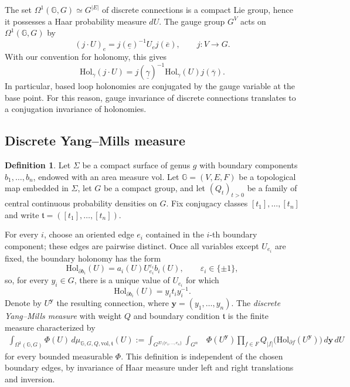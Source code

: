 \documentclass[11pt,a4paper,reqno]{article}
\theoremstyle{definition}
\newtheorem{definition}[theorem]{Definition}
\theoremstyle{remark}
\newcommand\vol{\mathrm{vol}}
\newcommand\Gbb{{\mathbb{G}}}
\newcommand\Hol{{\mathrm{Hol}}}
\begin{document}
The set $\Omega^1(\Gbb,G)\simeq G^{\vert E\vert}$ of discrete connections is a compact Lie group, hence it possesses a Haar probability measure $dU$. The gauge group $G^V$ acts on $\Omega^1(\Gbb,G)$ by
\[
(j\cdot U)_e = j(\underline{e})^{-1}U_e j(\overline{e}),\qquad j:V\to G.
\]
With our convention for holonomy, this gives
\[
\Hol_\gamma(j\cdot U)=j(\underline{\gamma})^{-1}\Hol_\gamma(U)j(\overline{\gamma}).
\]
In particular, based loop holonomies are conjugated by the gauge variable at the base point. For this reason, gauge invariance of discrete connections translates to a conjugation invariance of holonomies.

\subsection{Discrete Yang--Mills measure}

\begin{definition}\label{def:discrete-YM-measure}
Let $\Sigma$ be a compact surface of genus $g$ with boundary components
$b_1,\ldots,b_n$, endowed with an area measure $\vol$. Let
$\Gbb=(V,E,F)$ be a topological map embedded in $\Sigma$, let $G$ be a
compact group, and let $(Q_t)_{t>0}$ be a family of central continuous
probability densities on $G$. Fix conjugacy classes
$[t_1],\ldots,[t_n]$ and write
$\mathfrak t=([t_1],\ldots,[t_n])$.

For every $i$, choose an oriented edge $e_i$ contained in the $i$-th
boundary component; these edges are pairwise distinct. Once all variables
except $U_{e_i}$ are fixed, the boundary holonomy has the form
\[
 \Hol_{\partial b_i}(U)=a_i(U)U_{e_i}^{\varepsilon_i}b_i(U),
 \qquad \varepsilon_i\in\{\pm1\},
\]
so, for every $y_i\in G$, there is a unique value of $U_{e_i}$ for which
\[
 \Hol_{\partial b_i}(U)=y_it_iy_i^{-1}.
\]
Denote by $U^{\mathbf y}$ the resulting connection, where
$\mathbf y=(y_1,\ldots,y_n)$. The \emph{discrete Yang--Mills measure}
with weight $Q$ and boundary condition $\mathfrak t$ is the finite measure
characterized by
\begin{equation}\label{eq:DS-rigorous}
\begin{aligned}
 \int_{\Omega^1(\Gbb,G)}\! \Phi(U)\,
 d\mu_{\Gbb,G,Q,\vol,\mathfrak t}(U)
 :=
 \int_{G^{E\setminus\{e_1,\ldots,e_n\}}}\int_{G^n}
 &\Phi(U^{\mathbf y})
 \prod_{f\in F}Q_{|f|}\bigl(\Hol_{\partial f}(U^{\mathbf y})\bigr)
 \,d\mathbf y\,dU
\end{aligned}
\end{equation}
for every bounded measurable $\Phi$. This definition is independent of the
chosen boundary edges, by invariance of Haar measure under left and right
translations and inversion.
\end{definition}
\end{document}
